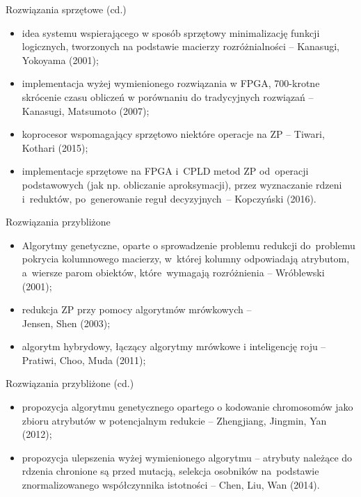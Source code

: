 \documentclass[10pt]{beamer}
\begin{document}
\begin{frame}{Rozwiązania sprzętowe (cd.)}
\begin{spacing}{1.2}
\begin{itemize}
\item idea systemu wspierającego w sposób sprzętowy minimalizację funkcji logicznych, tworzonych na podstawie macierzy rozróżnialności -- Kanasugi, Yokoyama (2001);
\item implementacja wyżej wymienionego rozwiązania w FPGA, 700-krotne skrócenie czasu obliczeń w porównaniu do tradycyjnych rozwiązań -- Kanasugi, Matsumoto (2007);
\item koprocesor wspomagający sprzętowo niektóre operacje na ZP -- Tiwari, Kothari (2015);
\item implementacje sprzętowe na FPGA i~CPLD metod ZP od~operacji podstawowych (jak np. obliczanie aproksymacji), przez wyznaczanie rdzeni i~reduktów, po~generowanie reguł decyzyjnych~-- Kopczyński (2016).
\end{itemize}
\end{spacing}
\end{frame}



\begin{frame}{Rozwiązania przybliżone}
\begin{spacing}{1.2}
\begin{itemize}
\item Algorytmy genetyczne, oparte o sprowadzenie problemu redukcji do~problemu pokrycia kolumnowego macierzy, w~której kolumny odpowiadają atrybutom, a~wiersze parom obiektów, które~wymagają rozróżnienia -- Wróblewski (2001);
\item redukcja ZP przy pomocy algorytmów mrówkowych --\\Jensen, Shen (2003);
\item algorytm hybrydowy, łączący algorytmy mrówkowe i inteligencję roju -- Pratiwi, Choo, Muda (2011);
\end{itemize}
\end{spacing}
\end{frame}


\begin{frame}{Rozwiązania przybliżone (cd.)}
\begin{spacing}{1.2}
\begin{itemize}
\item propozycja algorytmu genetycznego opartego o kodowanie chromosomów jako zbioru atrybutów w potencjalnym redukcie -- Zhengjiang, Jingmin, Yan (2012);
\item propozycja ulepszenia wyżej wymienionego algorytmu -- atrybuty należące do rdzenia chronione są przed mutacją, selekcja osobników na~podstawie znormalizowanego współczynnika istotności -- Chen, Liu, Wan (2014).
\end{itemize}
\end{spacing}
\end{frame}
\end{document}
